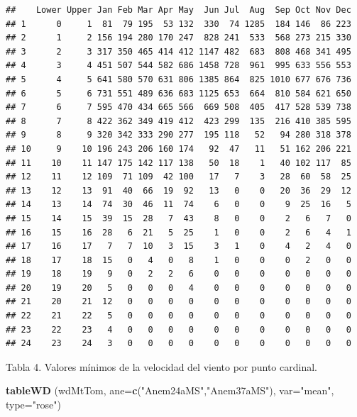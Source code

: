 \documentclass[]{article}
\newenvironment{Shaded}{\begin{snugshade}}{\end{snugshade}}
\newcommand{\KeywordTok}[1]{\textcolor[rgb]{0.13,0.29,0.53}{\textbf{{#1}}}}
\newcommand{\DataTypeTok}[1]{\textcolor[rgb]{0.13,0.29,0.53}{{#1}}}
\newcommand{\StringTok}[1]{\textcolor[rgb]{0.31,0.60,0.02}{{#1}}}
\newcommand{\NormalTok}[1]{{#1}}
\begin{document}
\begin{verbatim}
##    Lower Upper Jan Feb Mar Apr May  Jun Jul  Aug  Sep Oct Nov Dec
## 1      0     1  81  79 195  53 132  330  74 1285  184 146  86 223
## 2      1     2 156 194 280 170 247  828 241  533  568 273 215 330
## 3      2     3 317 350 465 414 412 1147 482  683  808 468 341 495
## 4      3     4 451 507 544 582 686 1458 728  961  995 633 556 553
## 5      4     5 641 580 570 631 806 1385 864  825 1010 677 676 736
## 6      5     6 731 551 489 636 683 1125 653  664  810 584 621 650
## 7      6     7 595 470 434 665 566  669 508  405  417 528 539 738
## 8      7     8 422 362 349 419 412  423 299  135  216 410 385 595
## 9      8     9 320 342 333 290 277  195 118   52   94 280 318 378
## 10     9    10 196 243 206 160 174   92  47   11   51 162 206 221
## 11    10    11 147 175 142 117 138   50  18    1   40 102 117  85
## 12    11    12 109  71 109  42 100   17   7    3   28  60  58  25
## 13    12    13  91  40  66  19  92   13   0    0   20  36  29  12
## 14    13    14  74  30  46  11  74    6   0    0    9  25  16   5
## 15    14    15  39  15  28   7  43    8   0    0    2   6   7   0
## 16    15    16  28   6  21   5  25    1   0    0    2   6   4   1
## 17    16    17   7   7  10   3  15    3   1    0    4   2   4   0
## 18    17    18  15   0   4   0   8    1   0    0    0   2   0   0
## 19    18    19   9   0   2   2   6    0   0    0    0   0   0   0
## 20    19    20   5   0   0   0   4    0   0    0    0   0   0   0
## 21    20    21  12   0   0   0   0    0   0    0    0   0   0   0
## 22    21    22   5   0   0   0   0    0   0    0    0   0   0   0
## 23    22    23   4   0   0   0   0    0   0    0    0   0   0   0
## 24    23    24   3   0   0   0   0    0   0    0    0   0   0   0
\end{verbatim}

Tabla 4. Valores mínimos de la velocidad del viento por punto cardinal.

\begin{Shaded}
\begin{Highlighting}[]
\KeywordTok{tableWD} \NormalTok{(wdMtTom, }\DataTypeTok{ane=}\KeywordTok{c}\NormalTok{(}\StringTok{"Anem24aMS"}\NormalTok{,}\StringTok{"Anem37aMS"}\NormalTok{), }\DataTypeTok{var=}\StringTok{"mean"}\NormalTok{, }\DataTypeTok{type=}\StringTok{"rose"}\NormalTok{)}
\end{Highlighting}
\end{Shaded}
\end{document}
